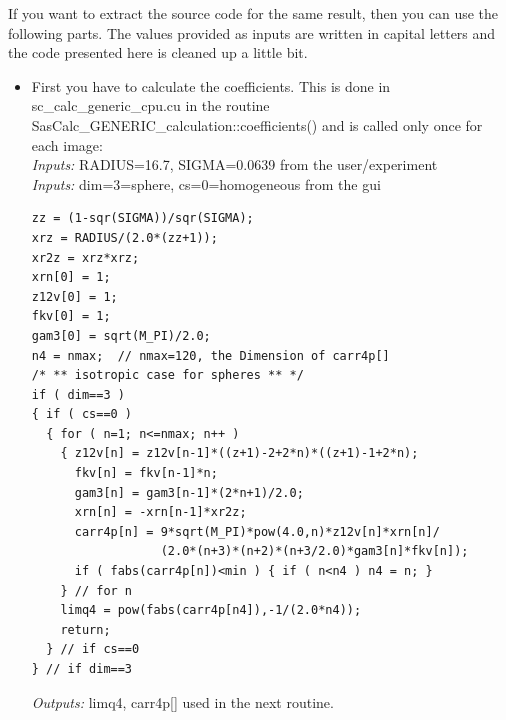 \documentclass[11pt]{article} %
\begin{document}
\clearpage
If you want to extract the source code for the same result, then you can use the following parts. The values provided as inputs are written in capital letters and the code presented here is cleaned up a little bit.
\begin{itemize}
\item First you have to calculate the coefficients. This is done in sc\_calc\_generic\_cpu.cu in the routine SasCalc\_GENERIC\_calculation::coefficients() and is called only once for each image: \\
{\it Inputs:} RADIUS{\small =16.7}, SIGMA{\small =0.0639} from the user/experiment \\
{\it Inputs:} dim=3{\small=sphere}, cs=0{\small =homogeneous} from the gui
\begin{lstlisting}[frame=single]
zz = (1-sqr(SIGMA))/sqr(SIGMA); 
xrz = RADIUS/(2.0*(zz+1));
xr2z = xrz*xrz;
xrn[0] = 1;
z12v[0] = 1;
fkv[0] = 1;
gam3[0] = sqrt(M_PI)/2.0;
n4 = nmax;  // nmax=120, the Dimension of carr4p[]
/* ** isotropic case for spheres ** */
if ( dim==3 )
{ if ( cs==0 )
  { for ( n=1; n<=nmax; n++ )
    { z12v[n] = z12v[n-1]*((z+1)-2+2*n)*((z+1)-1+2*n);
      fkv[n] = fkv[n-1]*n;
      gam3[n] = gam3[n-1]*(2*n+1)/2.0;
      xrn[n] = -xrn[n-1]*xr2z;
      carr4p[n] = 9*sqrt(M_PI)*pow(4.0,n)*z12v[n]*xrn[n]/
                  (2.0*(n+3)*(n+2)*(n+3/2.0)*gam3[n]*fkv[n]);
      if ( fabs(carr4p[n])<min ) { if ( n<n4 ) n4 = n; }
    } // for n
    limq4 = pow(fabs(carr4p[n4]),-1/(2.0*n4));
    return;
  } // if cs==0
} // if dim==3
\end{lstlisting}
{\it Outputs:} limq4, carr4p[] used in the next routine.


\end{itemize}
\end{document}
